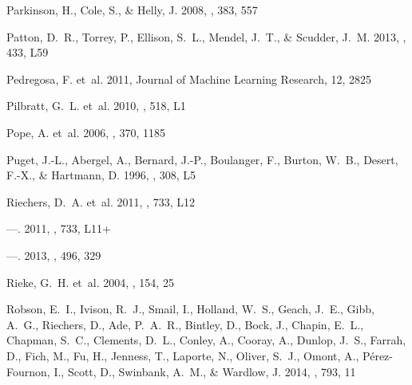 \documentclass[iop]{emulateapj}
\begin{document}
\begin{thebibliography}{107}
{Parkinson}, H., {Cole}, S., \& {Helly}, J. 2008, \mnras, 383, 557

{Patton}, D.~R., {Torrey}, P., {Ellison}, S.~L., {Mendel}, J.~T., \& {Scudder},
  J.~M. 2013, \mnras, 433, L59

{Pedregosa}, F. {et~al.} 2011, {Journal of Machine Learning Research}, 12, 2825

{Pilbratt}, G.~L. {et~al.} 2010, \aap, 518, L1

{Pope}, A. {et~al.} 2006, \mnras, 370, 1185

{Puget}, J.-L., {Abergel}, A., {Bernard}, J.-P., {Boulanger}, F., {Burton},
  W.~B., {Desert}, F.-X., \& {Hartmann}, D. 1996, \aap, 308, L5

{Riechers}, D.~A. {et~al.} 2011{}, \apjl, 733, L12

---. 2011{}, \apjl, 733, L11+

---. 2013, \nat, 496, 329

{Rieke}, G.~H. {et~al.} 2004, \apjs, 154, 25

{Robson}, E.~I., {Ivison}, R.~J., {Smail}, I., {Holland}, W.~S., {Geach},
  J.~E., {Gibb}, A.~G., {Riechers}, D., {Ade}, P.~A.~R., {Bintley}, D., {Bock},
  J., {Chapin}, E.~L., {Chapman}, S.~C., {Clements}, D.~L., {Conley}, A.,
  {Cooray}, A., {Dunlop}, J.~S., {Farrah}, D., {Fich}, M., {Fu}, H., {Jenness},
  T., {Laporte}, N., {Oliver}, S.~J., {Omont}, A., {P{\'e}rez-Fournon}, I.,
  {Scott}, D., {Swinbank}, A.~M., \& {Wardlow}, J. 2014, \apj, 793, 11


\end{thebibliography}
\end{document}
